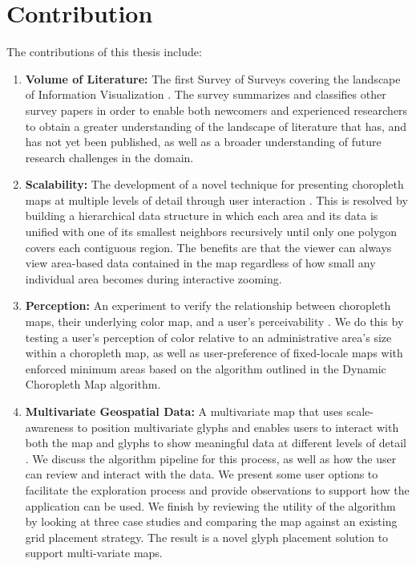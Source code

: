 \section{Contribution}
The contributions of this thesis include:
\begin{enumerate}
\item \textbf{Volume of Literature:} The first Survey of Surveys covering the landscape of Information Visualization \cite{mcnabb2017sos}. The survey summarizes and classifies other survey papers in order to enable both newcomers and experienced researchers to obtain a greater understanding of the landscape of literature that has, and has not yet been published, as well as a broader understanding of future research challenges in the domain.
\item \textbf{Scalability: }The development of a novel technique for presenting choropleth maps at multiple levels of detail through user interaction \cite{mcnabb2018dynamic}. This is resolved by building a hierarchical data structure in which each area and its data is unified with one of its smallest neighbors recursively until only one polygon covers each contiguous region. The benefits are that the viewer can always view area-based data contained in the map regardless of how small any individual area becomes during interactive zooming.
\item \textbf{Perception:} An experiment to verify the relationship between choropleth maps, their underlying color map, and a user's perceivability \cite{mcnabb2018when}. We do this by testing a user's perception of color relative to an administrative area's size within a choropleth map, as well as user-preference of fixed-locale maps with enforced minimum areas based on the algorithm outlined in the Dynamic Choropleth Map algorithm.
\item \textbf{Multivariate Geospatial Data:} A multivariate map that uses scale-awareness to position multivariate glyphs and enables users to interact with both the map and glyphs to show meaningful data at different levels of detail \cite{mcnabb2019multivariate}. We discuss the algorithm pipeline for this process, as well as how the user can review and interact with the data. We present some user options to facilitate the exploration process and provide observations to support how the application can be used. We finish by reviewing the utility of the algorithm by looking at three case studies and comparing the map against an existing grid placement strategy. The result is a novel glyph placement solution to support multi-variate maps.
\end{enumerate}


